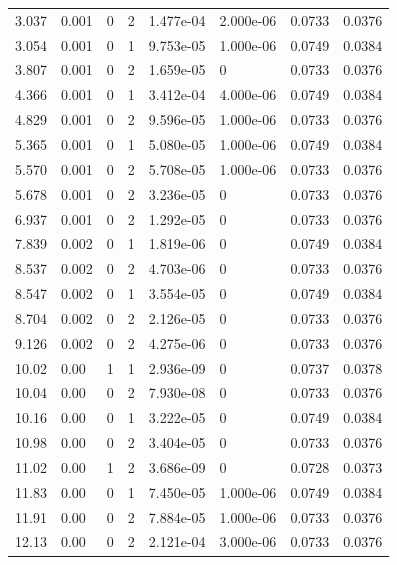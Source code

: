 \documentclass[preview]{standalone}
\begin{document}
{{\begin{tabular}{L{1.2cm}C{1.2cm} C{0.3cm}C{0.5cm} C{1.4cm}C{1.4cm} C{1.4cm}C{1.4cm}}
  3.037  &  0.001  & 0     &  2 &  1.477e-04  & 2.000e-06  & 0.0733 &  0.0376   \\ 
  3.054  &  0.001  & 0     &  1 &  9.753e-05  & 1.000e-06  & 0.0749 &  0.0384   \\ 
  3.807  &  0.001  & 0     &  2 &  1.659e-05  & 0  & 0.0733 &  0.0376   \\ 
  4.366  &  0.001  & 0     &  1 &  3.412e-04  & 4.000e-06  & 0.0749 &  0.0384   \\ 
  4.829  &  0.001  & 0     &  2 &  9.596e-05  & 1.000e-06  & 0.0733 &  0.0376   \\ 
  5.365  &  0.001  & 0     &  1 &  5.080e-05  & 1.000e-06  & 0.0749 &  0.0384   \\ 
  5.570  &  0.001  & 0     &  2 &  5.708e-05  & 1.000e-06  & 0.0733 &  0.0376   \\ 
  5.678  &  0.001  & 0     &  2 &  3.236e-05  & 0  & 0.0733 &  0.0376   \\ 
  6.937  &  0.001  & 0     &  2 &  1.292e-05  & 0  & 0.0733 &  0.0376   \\ 
  7.839  &  0.002  & 0     &  1 &  1.819e-06  & 0  & 0.0749 &  0.0384   \\ 
  8.537  &  0.002  & 0     &  2 &  4.703e-06  & 0  & 0.0733 &  0.0376   \\ 
  8.547  &  0.002  & 0     &  1 &  3.554e-05  & 0  & 0.0749 &  0.0384   \\ 
  8.704  &  0.002  & 0     &  2 &  2.126e-05  & 0  & 0.0733 &  0.0376   \\ 
  9.126  &  0.002  & 0     &  2 &  4.275e-06  & 0  & 0.0733 &  0.0376   \\ 
  10.02  &  0.00  & 1     &  1 &  2.936e-09  & 0  & 0.0737 &  0.0378   \\ 
  10.04  &  0.00  & 0     &  2 &  7.930e-08  & 0  & 0.0733 &  0.0376   \\ 
  10.16  &  0.00  & 0     &  1 &  3.222e-05  & 0  & 0.0749 &  0.0384   \\ 
  10.98  &  0.00  & 0     &  2 &  3.404e-05  & 0  & 0.0733 &  0.0376   \\ 
  11.02  &  0.00  & 1     &  2 &  3.686e-09  & 0  & 0.0728 &  0.0373   \\ 
  11.83  &  0.00  & 0     &  1 &  7.450e-05  & 1.000e-06  & 0.0749 &  0.0384   \\ 
  11.91  &  0.00  & 0     &  2 &  7.884e-05  & 1.000e-06  & 0.0733 &  0.0376   \\ 
  12.13  &  0.00  & 0     &  2 &  2.121e-04  & 3.000e-06  & 0.0733 &  0.0376   \\ 

\end{tabular}}}
\end{document}
